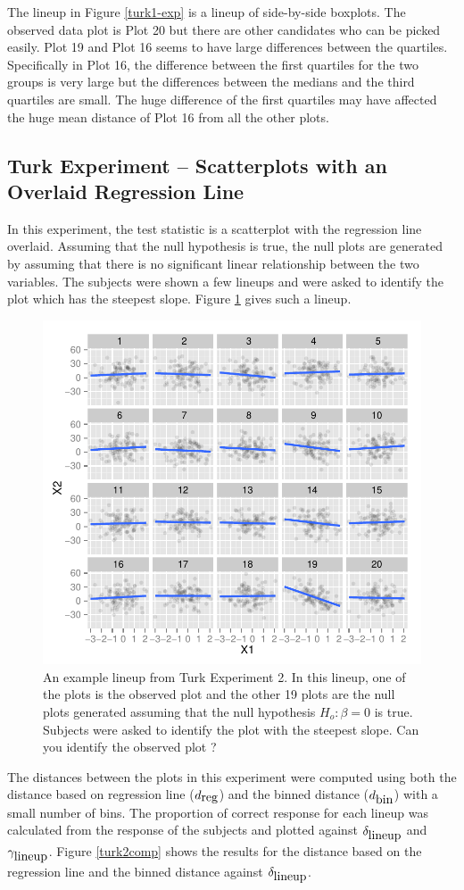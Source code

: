 \documentclass[12]{article}
\begin{document}
The lineup in Figure \ref{turk1-exp} is a lineup of side-by-side boxplots. The observed data plot is Plot 20 but there are other candidates who can be picked easily. Plot 19 and Plot 16 seems to have large differences between the quartiles. Specifically in Plot 16, the difference between the  
first quartiles for the two groups is very large but the differences between the medians and the third quartiles are small. The huge difference of the first quartiles may have affected the huge mean distance of Plot 16 from all the other plots.   

\subsection{Turk Experiment -- Scatterplots with an Overlaid Regression Line}

In this experiment, the test statistic is a scatterplot with the regression line overlaid. Assuming that the null hypothesis is true, the null plots are generated by assuming that there is no significant linear relationship between the two variables. The subjects were shown a few lineups and were asked to identify the plot which has the steepest slope. Figure \ref{turk2} gives such a lineup. 

\begin{figure}[htbp]
\centering
\includegraphics[width=.5\textwidth]{turk2-example.pdf}
\caption{An example lineup from Turk Experiment 2. In this lineup, one of the plots is the observed plot and the other 19 plots are the null plots generated assuming that the null hypothesis $H_o : \beta = 0$ is true. Subjects were asked to identify the plot with the steepest slope. Can you identify the observed plot ?}
\label{turk2}
\end{figure}

The distances between the plots in this experiment were computed using both the distance based on regression line ($d_{\hbox{reg}}$) and the binned distance ($d_{\hbox{bin}}$) with a small number of bins. The proportion of correct response for each lineup was calculated from the response of the subjects and plotted against $\delta_{\hbox{lineup}}$ and $\gamma_{\hbox{lineup}}$.  Figure \ref{turk2comp} shows the results for the distance based on the regression line and the binned distance against $\delta_{\hbox{lineup}}$.
\end{document}
